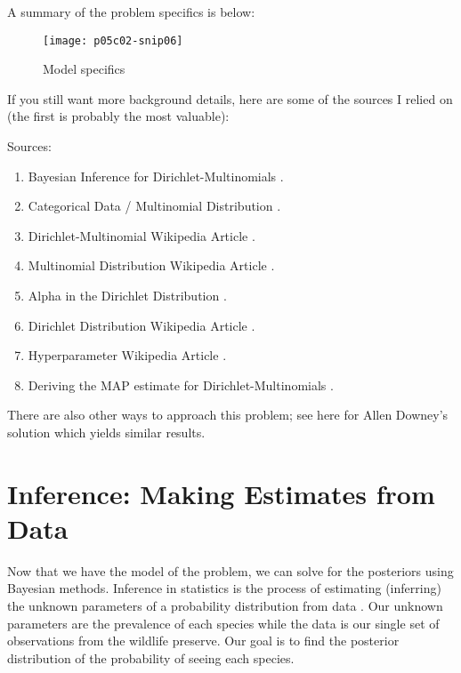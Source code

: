 A summary of the problem specifics is below:

\begin{figure*}[h]
    \texttt{[image: p05c02-snip06]}
    \caption{Model specifics}
\end{figure*}


If you still want more background details, here are some of the sources I relied on (the first is probably the most valuable):

Sources:


\begin{enumerate}
\item Bayesian Inference for Dirichlet-Multinomials \cite{MarkJohnsonDirichletMultinomials2019}.
\item Categorical Data / Multinomial Distribution \cite{ChristianHertaCategoricaldata2019}.
\item Dirichlet-Multinomial Wikipedia Article \cite{WikiPediaDirichletmultinomial2019}.
\item Multinomial Distribution Wikipedia Article \cite{WikiPediaMultinomialdistribution2019}.
\item Alpha in the Dirichlet Distribution \cite{stackexchangealphaDirichlet2019}.
\item Dirichlet Distribution Wikipedia Article \cite{WikiPediaDirichletdistributionl2019}.
\item Hyperparameter Wikipedia Article \cite{WikiPediaHyperparameter2019}.
\item Deriving the MAP estimate for Dirichlet-Multinomials \cite{stackexchangeMAPMultinomialDirichlet2019}.
\end{enumerate}

There are also other ways to approach this problem; see here for Allen Downey's solution \cite{AllenBDowneyThinkBayes2018} which yields similar results.

\section{Inference: Making Estimates from Data}

Now that we have the model of the problem, we can solve for the posteriors using Bayesian methods. Inference in statistics is the process of estimating (inferring) the unknown parameters of a probability distribution from data \cite{WikiPediaStatisticalinference2019}. Our unknown parameters are the prevalence of each species while the data is our single set of observations from the wildlife preserve. Our goal is to find the posterior distribution of the probability of seeing each species.

